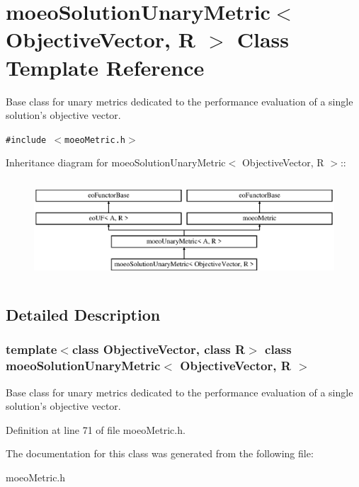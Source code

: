 \section{moeo\-Solution\-Unary\-Metric$<$ Objective\-Vector, R $>$ Class Template Reference}
\label{classmoeoSolutionUnaryMetric}
Base class for unary metrics dedicated to the performance evaluation of a single solution's objective vector.  


{\tt \#include $<$moeo\-Metric.h$>$}

Inheritance diagram for moeo\-Solution\-Unary\-Metric$<$ Objective\-Vector, R $>$::\begin{figure}[H]
\begin{center}
\leavevmode
\includegraphics[height=3.75839cm]{classmoeoSolutionUnaryMetric}
\end{center}
\end{figure}


\subsection{Detailed Description}
\subsubsection*{template$<$class Objective\-Vector, class R$>$ class moeo\-Solution\-Unary\-Metric$<$ Objective\-Vector, R $>$}

Base class for unary metrics dedicated to the performance evaluation of a single solution's objective vector. 



Definition at line 71 of file moeo\-Metric.h.

The documentation for this class was generated from the following file:\begin{CompactItemize}
\item 
moeo\-Metric.h\end{CompactItemize}
